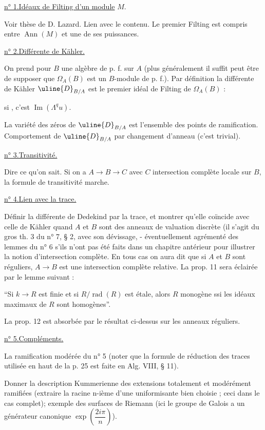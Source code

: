 \uline{n° 1.}\quad \uline{Idéaux de Filting d'un module} $M$.

Voir thèse de D. Lazard. Lien avec le contenu. Le premier Filting est compris entre $\operatorname{Ann}(M)$ et une de ses puissances.

\uline{n° 2.}\quad \uline{Différente de Kähler.}

On prend pour $B$ une algèbre de p. f. sur $A$ (plus généralement il suffit peut être de supposer que $\Omega_A(B)$ est un $B$-module de p. f.). Par définition la différente de Kähler $\uline{D}_{B/A}$ est le premier idéal de Filting de $\Omega_A(B)$ :

si
, c'est $\operatorname{Im}(\Lambda^q u)$.

La variété des zéros de $\uline{D}_{B/A}$ est l'ensemble des points de ramification. Comportement de $\uline{D}_{B/A}$ par changement d'anneau (c'est trivial).

\uline{n° 3.}\quad \uline{Transitivité.}

Dire ce qu'on sait. Si on a $A\to B\to C$ avec $C$ intersection complète locale sur $B$, la formule de transitivité marche.

\uline{n° 4.}\quad \uline{Lien avec la trace.}

Définir la différente de Dedekind par la trace, et montrer qu'elle coïncide avec celle de Kähler quand $A$ et $B$ sont des anneaux de valuation discrète (il s'agit du gros th. 3 du n° 7, § 2, avec son dévissage, - éventuellement agrémenté des lemmes du n° 6 s'ils n'ont pas été faits dans un chapitre antérieur pour illustrer la notion d'intersection complète. En tous cas on aura dit que si $A$ et $B$ sont réguliers, $A\to B$ est une intersection complète relative. La prop. 11 sera éclairée par le lemme suivant :

``Si $k\to R$ est finie et si $R/\operatorname{rad}(R)$ est étale, alors $R$ monogène ssi les idéaux maximaux de $R$ sont homogènes''.

La prop. 12 est absorbée par le résultat ci-dessus sur les anneaux réguliers.

\uline{n° 5.}\quad \uline{Compléments.}

La ramification modérée du n° 5 (noter que la formule de réduction des traces utilisée en haut de la p. 25 est faite en Alg. VIII, § 11).

Donner la description Kummerienne des extensions totalement et modérément ramifiées (extraire la racine n-ième d'une uniformisante bien choisie ; ceci dans le cas complet); exemple des surfaces de Riemann (ici le groupe de Galois a un générateur canonique $\exp\left(\dfrac{2i\pi}{n}\right)$).


